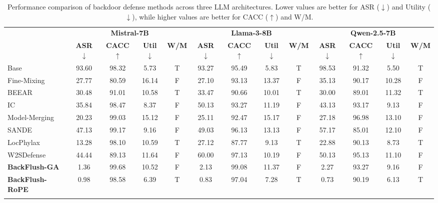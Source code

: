 \begin{table}[htbp]
\centering
\caption{Performance comparison of backdoor defense methods across three LLM architectures. Lower values are better for ASR ($\downarrow$) and Utility ($\downarrow$), while higher values are better for CACC ($\uparrow$) and W/M.}
\label{tab:defense_comparison}
\footnotesize
\renewcommand{\arraystretch}{1.25}
\setlength{\tabcolsep}{3.5pt}
\begin{adjustbox}{max width=\textwidth}
\begin{tabular}{p{2.6cm}|cccc|cccc|cccc}
\Xhline{1.15pt}
\multirow{2}{*}{\textbf{Method}} &
\multicolumn{4}{c|}{\textbf{Mistral-7B}} &
\multicolumn{4}{c|}{\textbf{Llama-3-8B}} &
\multicolumn{4}{c}{\textbf{Qwen-2.5-7B}} \\
\cmidrule(lr){2-5}\cmidrule(lr){6-9}\cmidrule(lr){10-13}
& \textbf{ASR}$\downarrow$ & \textbf{CACC}$\uparrow$ & \textbf{Util}$\downarrow$ & \textbf{W/M}
& \textbf{ASR}$\downarrow$ & \textbf{CACC}$\uparrow$ & \textbf{Util}$\downarrow$ & \textbf{W/M}
& \textbf{ASR}$\downarrow$ & \textbf{CACC}$\uparrow$ & \textbf{Util}$\downarrow$ & \textbf{W/M} \\
\Xhline{1.15pt}
Base
& 93.60 & 98.32 & 5.73 & T
& 93.27 & 95.49 & 5.83 & T
& 98.53 & 91.32 & 5.50 & T \\
\midrule
Fine-Mixing
& 27.77 & 80.59 & 16.14 & F
& 27.10 & 93.13 & 13.37 & F
& 35.13 & 90.17 & 10.28 & F \\
\rowcolor{gray!15}
BEEAR
& 30.48 & 91.01 & 10.58 & T
& 33.47 & 90.66 & 10.01 & T
& 30.00 & 89.01 & 11.32 & T \\
IC
& 35.84 & 98.47 & \colorbox{yellow!40}{8.37} & F
& 50.13 & 93.27 & 11.19 & F
& 43.13 & 93.17 & 9.13 & F \\
\rowcolor{gray!15}
Model-Merging
& 20.23 & 99.03 & 15.12 & F
& 25.11 & 92.47 & 15.17 & F
& 27.18 & \colorbox{green!30}{96.98} & 13.10 & F \\
SANDE
& 47.13 & \colorbox{yellow!40}{99.17} & 9.16 & F
& 49.03 & 96.13 & 13.13 & F
& 57.17 & 85.01 & 12.10 & F \\
\rowcolor{gray!15}
LocPhylax
& 13.28 & 98.10 & 10.59 & T
& 27.12 & 87.77 & \colorbox{yellow!40}{9.13} & T
& 22.88 & 90.13 & \colorbox{yellow!40}{8.73} & T \\
W2SDefense
& 44.44 & 89.13 & 11.64 & F
& 60.00 & \colorbox{yellow!40}{97.13} & 10.19 & F
& 50.13 & \colorbox{yellow!40}{95.13} & 11.10 & F \\
\midrule\midrule
\textbf{BackFlush-GA}
& \colorbox{yellow!40}{1.36} & \colorbox{green!30}{99.68} & 10.52 & F
& \colorbox{yellow!40}{2.13} & \colorbox{green!30}{99.08} & 11.37 & F
& \colorbox{yellow!40}{2.27} & 93.27 & 9.16 & F \\
\textbf{BackFlush-RoPE}
& \colorbox{green!30}{0.98} & 98.58 & \colorbox{green!30}{6.39} & T
& \colorbox{green!30}{0.83} & 97.04 & \colorbox{green!30}{7.28} & T
& \colorbox{green!30}{0.73} & 90.19 & \colorbox{green!30}{6.13} & T \\
\Xhline{1.15pt}
\end{tabular}
\end{adjustbox}
\end{table}

